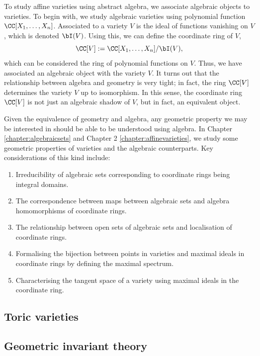 \documentclass[12pt]{amsart}
\theoremstyle{plain}
\begin{document}
To study affine varieties using abstract algebra, we associate algebraic objects to varieties.
To begin with, we study algebraic varieties using polynomial function $\CC[X_1, \ldots, X_n]$.
Associated to a variety $V$ is the ideal of functions vanishing on $V$, which is denoted $\bI(V)$.
Using this, we can define the coordinate ring of $V$, 
$$\CC[V] := \CC[X_1, \ldots, X_n] / \bI(V),$$
which can be considered the ring of polynomial functions on $V$.
Thus, we have associated an algebraic object with the variety $V$.
It turns out that the relationship between algebra and geometry is very tight;
in fact, the ring $\CC[V]$ determines the variety $V$ up to isomorphism.
In this sense, the coordinate ring $\CC[V]$ is not just an algebraic shadow of $V$, but in fact, an equivalent object.

Given the equivalence of geometry and algebra, any geometric property we may be interested in should be able to be understood using algebra.
In Chapter \ref{chapter:algebraicsets} and Chapter 2 \ref{chapter:affinevarieties}, we study some geometric properties of varieties and the algebraic counterparts.
Key considerations of this kind include:
\begin{enumerate}
\item Irreducibility of algebraic sets corresponding to coordinate rings being integral domains.
\item The correspondence between maps between algebraic sets and algebra homomorphisms of coordinate rings.
\item The relationship between open sets of algebraic sets and localisation of coordinate rings.
\item Formalising the bijection between points in varieties and maximal ideals in coordinate rings by defining the maximal spectrum.
\item Characterising the tangent space of a variety using maximal ideals in the coordinate ring.
\end{enumerate}

\newpage
\subsection*{Toric varieties}





\newpage
\subsection*{Geometric invariant theory}
\end{document}
